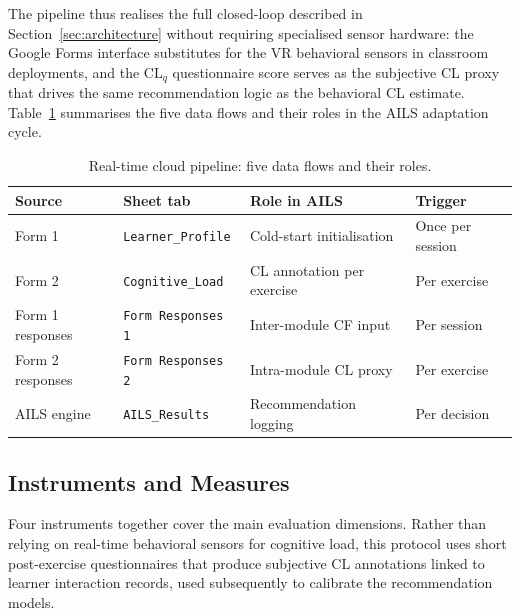 \documentclass[ASNA,twocolumn]{USG} %
\begin{document}
The pipeline thus realises the full closed-loop described in
Section~\ref{sec:architecture} without requiring specialised sensor
hardware: the Google Forms interface substitutes for the VR behavioral
sensors in classroom deployments, and the $\text{CL}_q$ questionnaire
score serves as the subjective CL proxy that drives the same
recommendation logic as the behavioral CL estimate.
Table~\ref{tab:pipeline_flows} summarises the five data flows and
their roles in the AILS adaptation cycle.


\begin{table}[ht]
\caption{Real-time cloud pipeline: five data flows and their roles.}
\label{tab:pipeline_flows}
\footnotesize %
\setlength{\tabcolsep}{3pt} %
\begin{tabularx}{\linewidth}{>{\raggedright\arraybackslash}p{2.2cm} >{\raggedright\arraybackslash}X >{\raggedright\arraybackslash}X >{\raggedright\arraybackslash}l}
\toprule
Source & Sheet tab & Role in AILS & Trigger \\
\midrule
Form 1 & \texttt{Learner\_Profile}      & Cold-start initialisation   & Once per session \\ \addlinespace
Form 2 & \texttt{Cognitive\_Load}       & CL annotation per exercise  & Per exercise \\ \addlinespace
Form 1 responses & \texttt{Form Responses 1} & Inter-module CF input & Per session \\ \addlinespace
Form 2 responses & \texttt{Form Responses 2} & Intra-module CL proxy & Per exercise \\ \addlinespace
AILS engine & \texttt{AILS\_Results}   & Recommendation logging      & Per decision \\
\bottomrule
\end{tabularx}
\end{table}

\subsection{Instruments and Measures}
\label{sec:instruments}

Four instruments together cover the main evaluation dimensions.
Rather than relying on real-time behavioral sensors for cognitive load,
this protocol uses short post-exercise questionnaires that produce
subjective CL annotations linked to learner interaction records, used
subsequently to calibrate the recommendation models.
\end{document}
